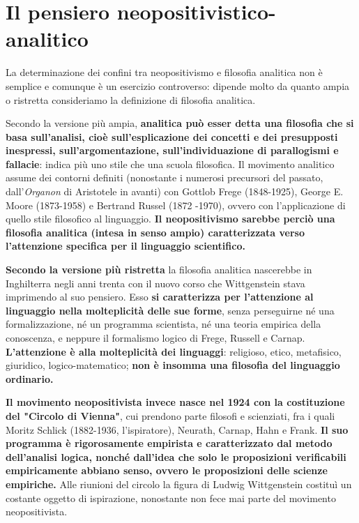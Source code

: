 \chapter{Il pensiero neopositivistico-analitico}
\bigskip
\bigskip
\bigskip

La determinazione dei confini tra neopositivismo
e filosofia analitica non è semplice e comunque
è un esercizio controverso: dipende molto da
quanto ampia o ristretta consideriamo la definizione
di filosofia analitica.

Secondo la versione più ampia, \textbf{analitica può esser
detta una filosofia che si basa sull'analisi, cioè sull'esplicazione dei concetti e dei
presupposti inespressi, sull'argomentazione, sull'individuazione
di parallogismi e fallacie}: indica più uno stile
che una scuola filosofica. Il movimento analitico
assume dei contorni definiti (nonostante i numerosi
precursori del passato, dall'\textit{Organon} di Aristotele in
avanti) con Gottlob Frege (1848-1925), George
E. Moore (1873-1958) e Bertrand Russel (1872 -1970),
ovvero con l'applicazione di quello stile filosofico
al linguaggio. \textbf{Il neopositivismo sarebbe perciò una
filosofia analitica (intesa in senso ampio) caratterizzata
verso l'attenzione specifica per il linguaggio scientifico.}

\textbf{Secondo la versione più ristretta} la filosofia analitica
nascerebbe in Inghilterra negli anni trenta con il nuovo
corso che Wittgenstein stava imprimendo al suo
pensiero. Esso \textbf{si caratterizza per l'attenzione al
linguaggio nella molteplicità delle sue forme}, senza
perseguirne né una formalizzazione, né un programma
scientista, né una teoria empirica della conoscenza, e
neppure il formalismo logico di Frege, Russell e Carnap.
\textbf{L'attenzione è alla molteplicità dei linguaggi}: religioso,
etico, metafisico, giuridico, logico-matematico; \textbf{non è insomma
una filosofia del linguaggio ordinario.}

\textbf{Il movimento neopositivista invece nasce nel 1924
con la costituzione del "Circolo di Vienna"}, cui
prendono parte filosofi e scienziati, fra i quali
Moritz Schlick (1882-1936, l'ispiratore), Neurath,
Carnap, Hahn e Frank. \textbf{Il suo programma è
rigorosamente empirista e caratterizzato dal
metodo dell'analisi logica, nonché dall'idea che
solo le proposizioni verificabili empiricamente
abbiano senso, ovvero le proposizioni delle scienze
empiriche.} Alle riunioni del circolo la figura
di Ludwig Wittgenstein costituì un costante
oggetto di ispirazione, nonostante non fece mai
parte del movimento neopositivista.

